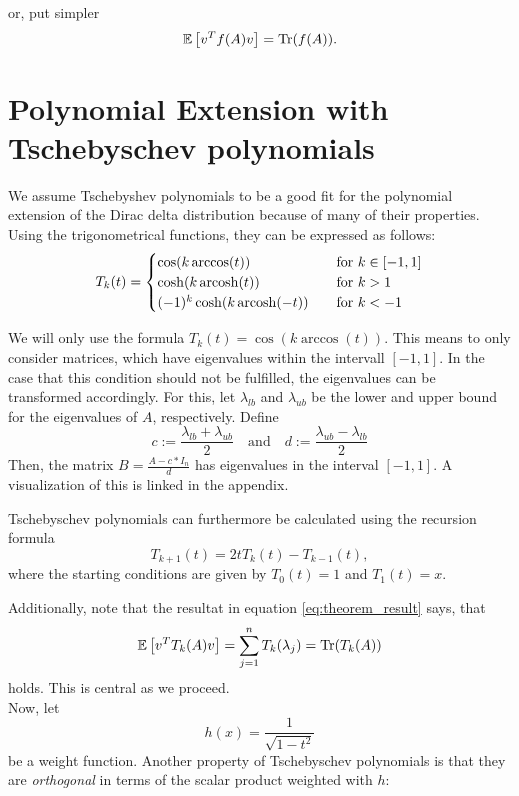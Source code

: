 or, put simpler
\begin{equation} \label{eq:theorem_result}
    \mathbb{E}\left[v^Tf(A)v\right] = \operatorname{Tr}(f(A)).
\end{equation}

\section{Polynomial Extension with Tschebyschev polynomials}
We assume Tschebyshev polynomials to be a good fit for the polynomial extension of the Dirac delta distribution because of many of their properties.
Using the trigonometrical functions, they can be expressed as follows:
\[ T_k(t) =
\begin{cases}
    \cos(k \arccos(t))            & \quad \text{for } k \in [-1, 1]\\
    \cosh(k \operatorname{arcosh}(t))           & \quad \text{for } k > 1\\
    (-1)^k \cosh(k \operatorname{arcosh}(-t))   & \quad \text{for } k < -1
\end{cases}
\]

We will only use the formula $T_k(t) = \cos(k \arccos(t))$.
This means to only consider matrices, which have eigenvalues within the intervall $[-1, 1]$.
In the case that this condition should not be fulfilled, the eigenvalues can be transformed accordingly.
For this, let $\lambda_{lb}$ and $\lambda_{ub}$ be the lower and upper bound for the eigenvalues of $A$, respectively.
Define
\[
c := \frac{\lambda_{lb} + \lambda_{ub}}{2} \quad \text{and} \quad d := \frac{\lambda_{ub} - \lambda_{lb}}{2}
\]
Then, the matrix $B = \frac{A - c*I_n}{d}$ has eigenvalues in the interval $[-1, 1]$.
A visualization of this is linked in the appendix.

Tschebyschev polynomials can furthermore be calculated using the recursion formula
\[
T_{k + 1}(t) = 2tT_k(t) - T_{k - 1}(t),
\]
where the starting conditions are given by $T_0(t) = 1$ and $T_1(t) = x$.

Additionally, note that the resultat in equation \ref{eq:theorem_result} says, that
\begin{equation} \label{eq:Tschebyschev_trace}
    \mathbb{E}\left[v^TT_k(A)v\right] = \sum_{j = 1}^n T_k(\lambda_j) = \operatorname{Tr}(T_k(A))
\end{equation}
holds. This is central as we proceed.\\

Now, let
\begin{equation} \label{eq:weight_function}
    h(x) = \frac{1}{\sqrt{1 - t^2}}
\end{equation}
be a weight function.
Another property of Tschebyschev polynomials is
that they are \emph{orthogonal} in terms of the scalar product weighted with $h$:

